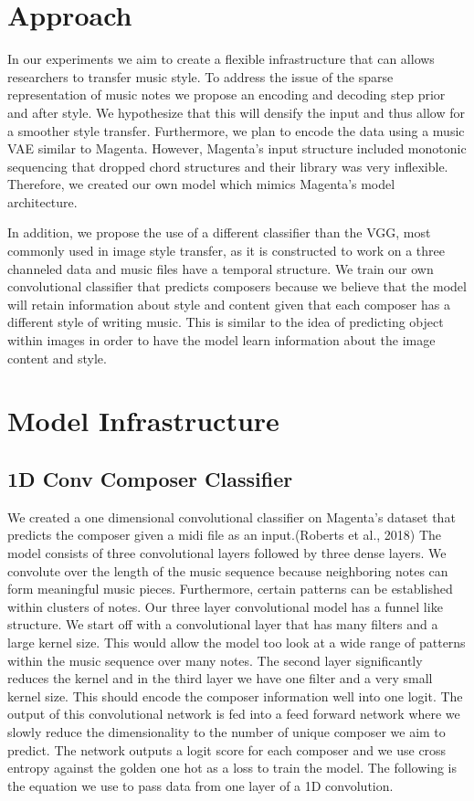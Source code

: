 \documentclass{article}
\begin{document}
\section{Approach}
\label{approach}

In our experiments we aim to create a flexible infrastructure that can allows researchers to transfer music style. To address the issue of the sparse representation of music notes we propose an encoding and decoding step prior and after style. We hypothesize that this will densify the input and thus allow for a smoother style transfer. Furthermore, we plan to encode the data using a music VAE similar to Magenta. However, Magenta's input structure included monotonic sequencing that dropped chord structures and their library was very inflexible. Therefore, we created our own model which mimics Magenta's model architecture.

In addition, we propose the use of a different classifier than the VGG, most commonly used in image style transfer, as it is constructed to work on a three channeled data and music files have a temporal structure. We train our own convolutional classifier that predicts composers because we believe that the model will retain information about style and content given that each composer has a different style of writing music. This is similar to the idea of predicting object within images in order to have the model learn information about the image content and style. 


\section{Model Infrastructure}
\label{infrastructure}

\subsection{1D Conv Composer Classifier}

We created a one dimensional convolutional classifier on Magenta’s dataset that predicts the composer given a midi file as an input.(Roberts et al., 2018)  The model consists of three convolutional layers followed by three dense layers. We convolute over the length of the music sequence because neighboring notes can form meaningful music pieces. Furthermore, certain patterns can be established within clusters of notes. Our three layer convolutional model has a funnel like structure. We start off with a convolutional layer that has many filters and a large kernel size. This would allow the model too look at a wide range of patterns within the music sequence over many notes. The second layer significantly reduces the kernel and in the third layer we have one filter and a very small kernel size. This should encode the composer information well into one logit. The output of this convolutional network is fed into a feed forward network where we slowly reduce the dimensionality to the number of unique composer we aim to predict. The network outputs a logit score for each composer and we use cross entropy against the golden one hot as a loss to train the model. The following is the equation we use to pass data from one layer of a 1D convolution.
\end{document}
